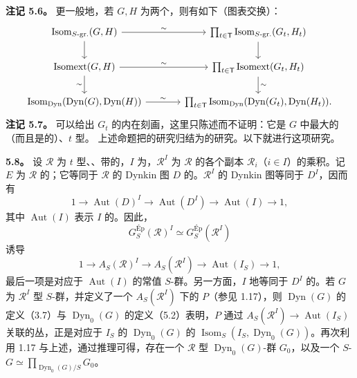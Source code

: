 \textbf{注记 5.6。} 更一般地，若 $G,H$ 为两个，则有如下（图表交换）：
\[
\begin{tikzcd}[column sep=large]
\operatorname{Isom}_{S\text{-gr.}}(G,H) \arrow[r,"\sim"]\arrow[d]&\prod_{t\in\mathsf T}\operatorname{Isom}_{S\text{-gr.}}(G_t,H_t)\arrow[d]\\
\operatorname{Isomext}(G,H)\arrow[r,"\sim"]\arrow[d,"\sim"']&\prod_{t\in\mathsf T}\operatorname{Isomext}(G_t,H_t)\arrow[d,"\sim"]\\
\operatorname{Isom}_{\mathrm{Dyn}}(\operatorname{Dyn}(G),\operatorname{Dyn}(H))\arrow[r,"\sim"]&\prod_{t\in\mathsf T}\operatorname{Isom}_{\mathrm{Dyn}}(\operatorname{Dyn}(G_t),\operatorname{Dyn}(H_t)).
\end{tikzcd}
\]
\textbf{注记 5.7。} 可以给出 $G_t$ 的内在刻画，这里只陈述而不证明：它是 $G$ 中最大的（而且是的）、$t$ 型。
上述命题把的研究归结为的研究。以下就进行这项研究。

\textbf{5.8。} 设 $\mathscr R$ 为 $t$ 型、、带的，$I$ 为，$\mathscr R^I$ 为 $\mathscr R$ 的各个副本 $\mathscr R_i$（$i\in I$）的乘积。记 $E$ 为 $\mathscr R$ 的；它等同于 $\mathscr R$ 的 Dynkin 图 $D$ 的。$\mathscr R^I$ 的 Dynkin 图等同于 $D^I$，因而有
\[1\longrightarrow\operatorname{Aut}(D)^I\longrightarrow\operatorname{Aut}(D^I)\longrightarrow\operatorname{Aut}(I)\longrightarrow1,\]
其中 $\operatorname{Aut}(I)$ 表示 $I$ 的。因此，
\[G_S^{\mathrm{Ép}}(\mathscr R)^I\simeq G_S^{\mathrm{Ép}}(\mathscr R^I)\]
诱导
\[1\longrightarrow A_S(\mathscr R)^I\longrightarrow A_S(\mathscr R^I)\longrightarrow\operatorname{Aut}(I_S)\longrightarrow1,\]
最后一项是对应于 $\operatorname{Aut}(I)$ 的常值 $S$-群。另一方面，$I$ 地等同于 $D^I$ 的。若 $G$ 为 $\mathscr R^I$ 型 $S$-群，并定义了一个 $A_S(\mathscr R^I)$ 下的 $P$（参见 1.17），则 $\operatorname{Dyn}(G)$ 的定义（3.7）与 $\operatorname{Dyn}_0(G)$ 的定义（5.2）表明，$P$ 通过 $A_S(\mathscr R^I)\to\operatorname{Aut}(I_S)$ 关联的丛，正是对应于 $I_S$ 的 $\operatorname{Dyn}_0(G)$ 的 $\operatorname{Isom}_S(I_S,\operatorname{Dyn}_0(G))$。再次利用 1.17 与上述，通过推理可得，存在一个 $\mathscr R$ 型 $\operatorname{Dyn}_0(G)$-群 $G_0$，以及一个 $S$- $G\simeq\prod_{\operatorname{Dyn}_0(G)/S}G_0$。

